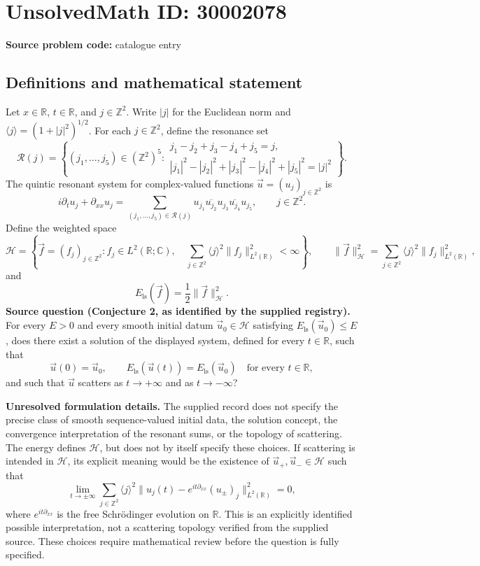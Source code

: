 \documentclass[11pt]{article}
\newcommand{\Z}{\mathbb{Z}}
\newcommand{\R}{\mathbb{R}}
\newcommand{\C}{\mathbb{C}}
\begin{document}
\section*{UnsolvedMath ID: 30002078}
\textbf{Source problem code:} catalogue entry
\subsection{Definitions and mathematical statement}
Let $x\in\R$, $t\in\R$, and $j\in\Z^2$. Write $|j|$ for the Euclidean norm and $\langle j\rangle=(1+|j|^2)^{1/2}$. For each $j\in\Z^2$, define the resonance set
\[
\mathcal R(j)=\left\{(j_1,\ldots,j_5)\in(\Z^2)^5:\begin{array}{l}
j_1-j_2+j_3-j_4+j_5=j,\\
|j_1|^2-|j_2|^2+|j_3|^2-|j_4|^2+|j_5|^2=|j|^2
\end{array}\right\}.
\]
The quintic resonant system for complex-valued functions $\vec u=(u_j)_{j\in\Z^2}$ is
\[
i\partial_tu_j+\partial_{xx}u_j
=\sum_{(j_1,\ldots,j_5)\in\mathcal R(j)}
u_{j_1}\overline{u_{j_2}}u_{j_3}\overline{u_{j_4}}u_{j_5},
\qquad j\in\Z^2.
\]
Define the weighted space
\[
\mathcal H=\left\{\vec f=(f_j)_{j\in\Z^2}: f_j\in L^2(\R;\C),\quad
\sum_{j\in\Z^2}\langle j\rangle^2\|f_j\|_{L^2(\R)}^2<\infty\right\},
\qquad
\|\vec f\|_{\mathcal H}^2=\sum_{j\in\Z^2}\langle j\rangle^2\|f_j\|_{L^2(\R)}^2,
\]
and
\[
E_{\mathrm{ls}}(\vec f)=\frac12\|\vec f\|_{\mathcal H}^2.
\]
\textbf{Source question (Conjecture 2, as identified by the supplied registry).} For every $E>0$ and every smooth initial datum $\vec u_0\in\mathcal H$ satisfying $E_{\mathrm{ls}}(\vec u_0)\le E$, does there exist a solution of the displayed system, defined for every $t\in\R$, such that
\[
\vec u(0)=\vec u_0,\qquad
E_{\mathrm{ls}}(\vec u(t))=E_{\mathrm{ls}}(\vec u_0)\quad\text{for every }t\in\R,
\]
and such that $\vec u$ scatters as $t\to+\infty$ and as $t\to-\infty$?

\textbf{Unresolved formulation details.} The supplied record does not specify the precise class of smooth sequence-valued initial data, the solution concept, the convergence interpretation of the resonant sums, or the topology of scattering. The energy defines $\mathcal H$, but does not by itself specify these choices. If scattering is intended in $\mathcal H$, its explicit meaning would be the existence of $\vec u_+,\vec u_-\in\mathcal H$ such that
\[
\lim_{t\to\pm\infty}\sum_{j\in\Z^2}\langle j\rangle^2
\bigl\|u_j(t)-e^{it\partial_{xx}}(u_\pm)_j\bigr\|_{L^2(\R)}^2=0,
\]
where $e^{it\partial_{xx}}$ is the free Schr\"odinger evolution on $\R$. This is an explicitly identified possible interpretation, not a scattering topology verified from the supplied source. These choices require mathematical review before the question is fully specified.
\end{document}
